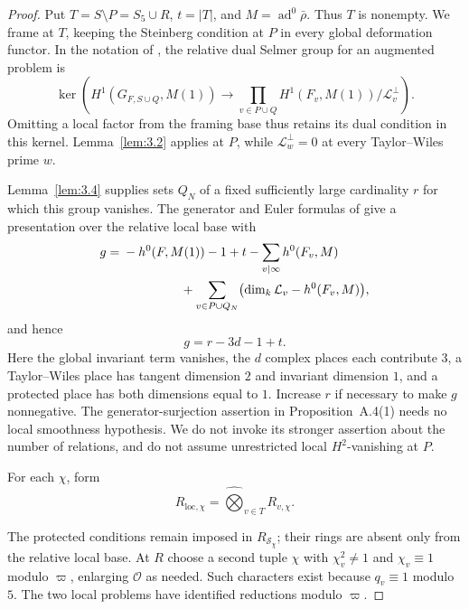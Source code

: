 \documentclass[11pt,a4paper]{article}
\numberwithin{equation}{section}
\begin{document}
\begin{proof}
Put \(T=S\setminus P=S_5\cup R\), \(t=|T|\), and \(M=\operatorname{ad}^0\bar\rho\). Thus \(T\) is nonempty. We frame at \(T\), keeping the Steinberg condition at \(P\) in every global deformation functor. In the notation of \cite[\S A.2]{AKT}, the relative dual Selmer group for an augmented problem is
\begin{equation*}
\ker\left(
H^1(G_{F,S\cup Q},M(1))\longrightarrow
\prod_{v\in P\cup Q}
H^1(F_v,M(1))/\mathcal L_v^\perp
\right).
\end{equation*}
Omitting a local factor from the framing base thus retains its dual condition in this kernel. Lemma~\ref{lem:3.2} applies at \(P\), while \(\mathcal L_w^\perp=0\) at every Taylor--Wiles prime \(w\).

Lemma~\ref{lem:3.4} supplies sets \(Q_N\) of a fixed sufficiently large cardinality \(r\) for which this group vanishes. The generator and Euler formulas of \cite[Proposition~A.4(1)--(2)]{AKT} give a presentation over the relative local base with
\begin{align*}
g={}&-h^0(F,M(1))-1+t
-\sum_{v\mid\infty}h^0(F_v,M)\\
&\hspace{16mm}+\sum_{v\in P\cup Q_N}
\bigl(\dim_k\mathcal L_v-h^0(F_v,M)\bigr),
\end{align*}
and hence
\begin{equation*}
g=r-3d-1+t.
\end{equation*}
Here the global invariant term vanishes, the \(d\) complex places each contribute \(3\), a Taylor--Wiles place has tangent dimension \(2\) and invariant dimension \(1\), and a protected place has both dimensions equal to \(1\). Increase \(r\) if necessary to make \(g\) nonnegative. The generator-surjection assertion in Proposition~A.4(1) needs no local smoothness hypothesis. We do not invoke its stronger assertion about the number of relations, and do not assume unrestricted local \(H^2\)-vanishing at \(P\).

For each \(\chi\), form
\begin{equation*}
R_{\mathrm{loc},\chi}
=\widehat\bigotimes_{v\in T}R_{v,\chi}.
\end{equation*}

The protected conditions remain imposed in \(R_{\mathcal S_\chi}\); their rings are absent only from the relative local base. At \(R\) choose a second tuple \(\chi\) with \(\chi_v^2\ne1\) and \(\chi_v\equiv1\) modulo \(\varpi\), enlarging \(\mathcal O\) as needed. Such characters exist because \(q_v\equiv1\) modulo \(5\). The two local problems have identified reductions modulo \(\varpi\).


\end{proof}
\end{document}
